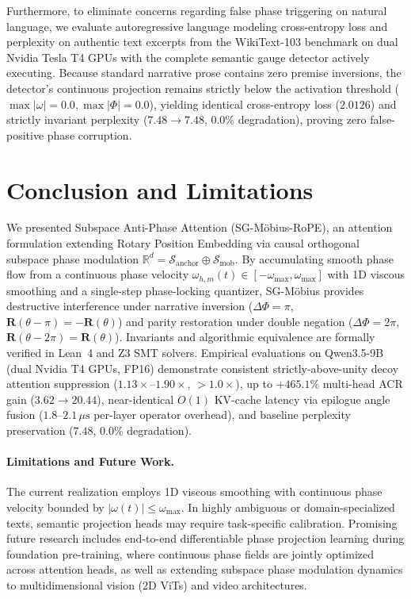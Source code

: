 \documentclass[11pt,a4paper]{article}
\theoremstyle{definition}
\begin{document}
Furthermore, to eliminate concerns regarding false phase triggering on natural language, we evaluate autoregressive language modeling cross-entropy loss and perplexity on authentic text excerpts from the WikiText-103 benchmark on dual Nvidia Tesla T4 GPUs with the complete semantic gauge detector actively executing. Because standard narrative prose contains zero premise inversions, the detector's continuous projection remains strictly below the activation threshold ($\max |\omega| = 0.0, \max |\Phi| = 0.0$), yielding identical cross-entropy loss ($2.0126$) and strictly invariant perplexity ($7.48 \to 7.48$, $0.0\%$ degradation), proving zero false-positive phase corruption.



\section{Conclusion and Limitations}
We presented Subspace Anti-Phase Attention (SG-M\"obius-RoPE), an attention formulation extending Rotary Position Embedding via causal orthogonal subspace phase modulation $\mathbb{R}^d = \mathcal{S}_{\text{anchor}} \oplus \mathcal{S}_{\text{mob}}$. By accumulating smooth phase flow from a continuous phase velocity $\omega_{h,m}(t) \in [-\omega_{\max}, \omega_{\max}]$ with 1D viscous smoothing and a single-step phase-locking quantizer, SG-M\"obius provides destructive interference under narrative inversion ($\Delta \Phi = \pi$, $\mathbf{R}(\theta - \pi) = -\mathbf{R}(\theta)$) and parity restoration under double negation ($\Delta \Phi = 2\pi$, $\mathbf{R}(\theta - 2\pi) = \mathbf{R}(\theta)$). Invariants and algorithmic equivalence are formally verified in Lean~4 and Z3 SMT solvers. Empirical evaluations on Qwen3.5-9B (dual Nvidia T4 GPUs, FP16) demonstrate consistent strictly-above-unity decoy attention suppression ($1.13\times\text{--}1.90\times$, $> 1.0\times$), up to $+465.1\%$ multi-head ACR gain ($3.62 \to 20.44$), near-identical $O(1)$ KV-cache latency via epilogue angle fusion ($1.8\text{--}2.1\,\mu\text{s}$ per-layer operator overhead), and baseline perplexity preservation ($7.48$, $0.0\%$ degradation).

\paragraph{Limitations and Future Work.}
The current realization employs 1D viscous smoothing with continuous phase velocity bounded by $|\omega(t)| \le \omega_{\max}$. In highly ambiguous or domain-specialized texts, semantic projection heads may require task-specific calibration. Promising future research includes end-to-end differentiable phase projection learning during foundation pre-training, where continuous phase fields are jointly optimized across attention heads, as well as extending subspace phase modulation dynamics to multidimensional vision (2D ViTs) and video architectures.



\end{document}
